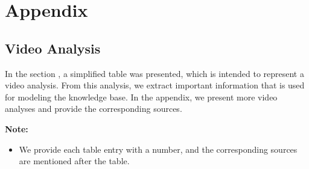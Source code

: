 \chapter{Appendix}
\label{chap:appendix}

\section{Video Analysis}
In the section , a simplified table was presented, which is intended to represent a video analysis. From this analysis, we extract important information that is used for modeling the knowledge base.
In the appendix, we present more video analyses and provide the corresponding sources.

\textbf{Note:}
\begin{itemize}
    \item We provide each table entry with a number, and the corresponding sources are mentioned after the table.
\end{itemize}

